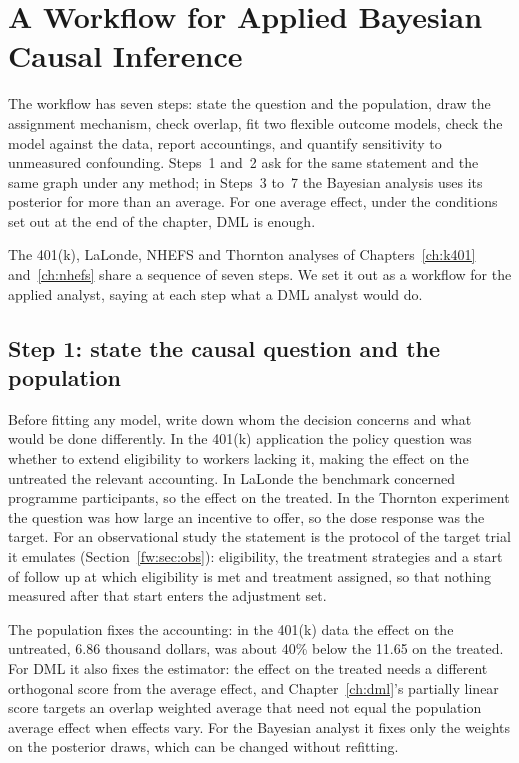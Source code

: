 \chapter{A Workflow for Applied Bayesian Causal Inference}\label{ch:workflow}

\begin{tcolorbox}[colback=gray!6,colframe=gray!50,title=In brief,fonttitle=\normalfont\itshape,coltitle=black,colbacktitle=gray!15,boxrule=0.4pt,arc=1pt]
The workflow has seven steps: state the question and the population, draw the assignment mechanism, check overlap, fit two flexible outcome models, check the model against the data, report accountings, and quantify sensitivity to unmeasured confounding. Steps~1 and~2 ask for the same statement and the same graph under any method; in Steps~3 to~7 the Bayesian analysis uses its posterior for more than an average. For one average effect, under the conditions set out at the end of the chapter, DML is enough.
\end{tcolorbox}

The 401(k), LaLonde, NHEFS and Thornton analyses of Chapters~\ref{ch:k401} and~\ref{ch:nhefs} share a sequence of seven steps. We set it out as a workflow for the applied analyst, saying at each step what a DML analyst would do.

\section{Step 1: state the causal question and the population}

Before fitting any model, write down whom the decision concerns and what would be done differently. In the 401(k) application the policy question was whether to extend eligibility to workers lacking it, making the effect on the untreated the relevant accounting. In LaLonde the benchmark concerned programme participants, so the effect on the treated. In the Thornton experiment the question was how large an incentive to offer, so the dose response was the target. For an observational study the statement is the protocol of the target trial it emulates (Section~\ref{fw:sec:obs}): eligibility, the treatment strategies and a start of follow up at which eligibility is met and treatment assigned, so that nothing measured after that start enters the adjustment set.

The population fixes the accounting: in the 401(k) data the effect on the untreated, 6.86 thousand dollars, was about 40\% below the 11.65 on the treated. For DML it also fixes the estimator: the effect on the treated needs a different orthogonal score from the average effect, and Chapter~\ref{ch:dml}'s partially linear score targets an overlap weighted average that need not equal the population average effect when effects vary. For the Bayesian analyst it fixes only the weights on the posterior draws, which can be changed without refitting.

